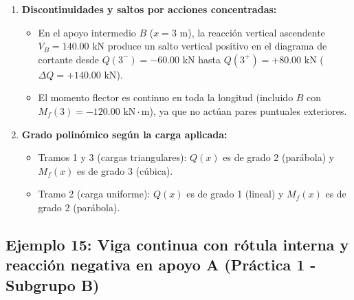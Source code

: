 {\begin{enumerate}
        \item \textbf{Discontinuidades y saltos por acciones concentradas:}

              \begin{itemize}

                  \item En el apoyo intermedio $B$ ($x = 3\text{ m}$), la reacción vertical ascendente $V_B = 140.00\text{ kN}$ produce un salto vertical positivo en el diagrama de cortante desde $Q(3^-) = -60.00\text{ kN}$ hasta $Q(3^+) = +80.00\text{ kN}$ ($\Delta Q = +140.00\text{ kN}$).

                  \item El momento flector es continuo en toda la longitud (incluido $B$ con $M_f(3) = -120.00\text{ kN}\cdot\text{m}$), ya que no actúan pares puntuales exteriores.

              \end{itemize}



        \item \textbf{Grado polinómico según la carga aplicada:}

              \begin{itemize}

                  \item Tramos 1 y 3 (cargas triangulares): $Q(x)$ es de grado 2 (parábola) y $M_f(x)$ es de grado 3 (cúbica).

                  \item Tramo 2 (carga uniforme): $Q(x)$ es de grado 1 (lineal) y $M_f(x)$ es de grado 2 (parábola).

              \end{itemize}

    \end{enumerate}

}



\subsection{Ejemplo 15: Viga continua con rótula interna y reacción negativa en apoyo A (Práctica 1 - Subgrupo B)}



